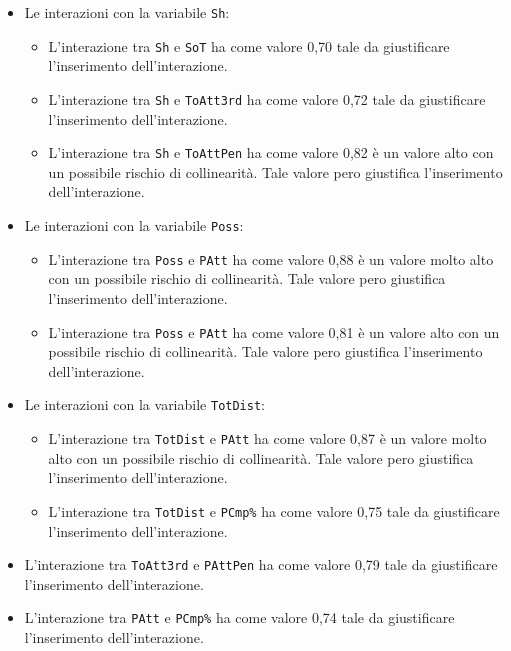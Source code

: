 \begin{itemize}
	\item Le interazioni con la variabile \texttt{Sh}:
	\begin{itemize}
		\item L'interazione tra \texttt{Sh} e \texttt{SoT} ha come valore 0,70 tale da giustificare l'inserimento dell'interazione.
		\item L'interazione tra \texttt{Sh} e \texttt{ToAtt3rd} ha come valore 0,72 tale da giustificare l'inserimento dell'interazione.
		\item L'interazione tra \texttt{Sh} e \texttt{ToAttPen} ha come valore 0,82 è un valore alto con un possibile rischio di collinearità. Tale valore pero giustifica l'inserimento dell'interazione.
	\end{itemize}
	\item Le interazioni con la variabile \texttt{Poss}:
	\begin{itemize}
		\item L'interazione tra \texttt{Poss} e \texttt{PAtt} ha come valore 0,88 è un valore molto alto con un possibile rischio di collinearità. Tale valore pero giustifica l'inserimento dell'interazione.
		\item L'interazione tra \texttt{Poss} e \texttt{PAtt} ha come valore 0,81 è un valore alto con un possibile rischio di collinearità. Tale valore pero giustifica l'inserimento dell'interazione.
	\end{itemize}
	\item Le interazioni con la variabile \texttt{TotDist}:
	\begin{itemize}
		\item L'interazione tra \texttt{TotDist} e \texttt{PAtt} ha come valore 0,87 è un valore molto alto con un possibile rischio di collinearità. Tale valore pero giustifica l'inserimento dell'interazione.
		\item L'interazione tra \texttt{TotDist} e \texttt{PCmp\%} ha come valore 0,75 tale da giustificare l'inserimento dell'interazione.
	\end{itemize}

	\item L'interazione tra \texttt{ToAtt3rd} e \texttt{PAttPen} ha come valore 0,79 tale da giustificare l'inserimento dell'interazione.
	\item L'interazione tra \texttt{PAtt} e \texttt{PCmp\%} ha come valore 0,74 tale da giustificare l'inserimento dell'interazione.
\end{itemize}  


